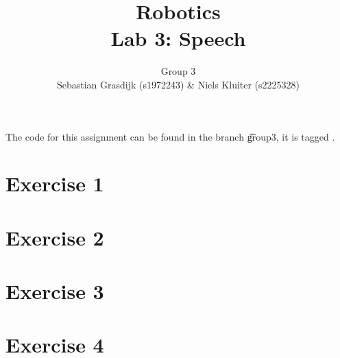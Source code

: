\documentclass[a4paper]{article}
\title{Robotics\\ Lab 3: Speech}
\author{Group 3\\Sebastian Grasdijk (s1972243) \& Niels Kluiter (s2225328)}
\begin{document}
\maketitle

\noindent The code for this assignment can be found in the branch \t{group3}, it is tagged .

\section*{Exercise 1}


\section*{Exercise 2}


\section*{Exercise 3}


\section*{Exercise 4}


\printbibliography

\clearpage
\appendix

\end{document}
